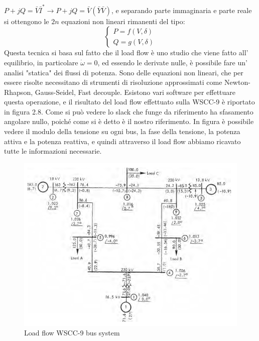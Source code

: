 \documentclass[Lau,noexaminfo]{sapthesis}
\begin{document}
	$P+jQ=\bar{V}\bar{I}^* \rightarrow P+jQ=\bar{V}(\bar{Y}\bar{V})$, e separando parte immaginaria e parte reale si ottengono le $2n$ equazioni non lineari rimanenti del tipo:\\
	\[
	\begin{cases}
	P=f(V,\delta)\\
	Q=g(V,\delta)
	\end{cases}
	\]
	Questa tecnica si basa sul fatto che il load flow è uno studio che viene fatto all' equilibrio, in particolare $\dot{\omega}=0$, ed essendo le derivate nulle, è possibile fare un' analisi "statica" dei flussi di potenza. Sono delle equazioni non lineari, che per essere risolte necessitano di strumenti di risoluzione approssimati come Newton-Rhapson, Gauss-Seidel, Fast decouple. Esistono vari software per effettuare questa operazione, e il risultato del load flow effettuato sulla WSCC-9 è riportato in figura 2.8. Come si può vedere lo slack che funge da riferimento ha sfasamento angolare nullo, poiché come si è detto è il nostro riferimento. In figura è possibile vedere il modulo della tensione su ogni bus, la fase della tensione, la potenza attiva e la potenza reattiva, e quindi attraverso il load flow abbiamo ricavato tutte le informazioni necessarie.
	\begin{figure}[h]
		\centering
		\includegraphics[scale=0.5]{WSCC-powerflow}
		\caption{Load flow WSCC-9 bus system}
	\end{figure}\newpage
\end{document}
